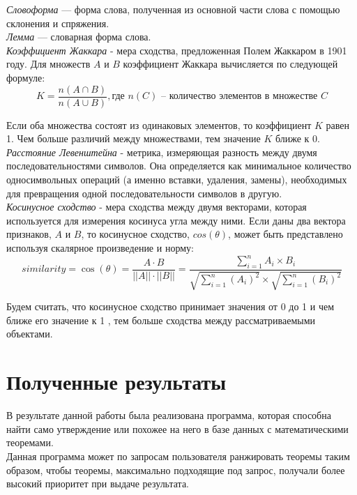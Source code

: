 \documentclass[12pt]{article}
\begin{document}
\textit{Словоформа} --- форма слова, полученная из основной части слова с помощью склонения и спряжения.\\

\textit{Лемма} --- словарная форма слова.\\

\textit{Коэффициент Жаккара} \cite{Jaccard} -  мера сходства, предложенная Полем Жаккаром в 1901 году. Для множеств $A$ и $B$ коэффициент Жаккара вычисляется по следующей формуле: $$K=\dfrac{n(A \cap B)}{n(A \cup B)}, \text{где } n(C) \text{ --  количество элементов в множестве } C$$

Если оба множества состоят из одинаковых элементов, то коэффициент $K$ равен 1. Чем больше различий между множествами, тем значение $K$ ближе к $0$. \\

\textit{Расстояние Левенштейна}  - метрика, измеряющая разность между двумя последовательностями символов. Она определяется как минимальное количество односимвольных операций (а именно вставки, удаления, замены), необходимых для превращения одной последовательности символов в другую.\cite{Levenshtein} \\

\textit{Косинусное сходство} -  мера сходства между двумя векторами, которая используется для измерения косинуса угла между ними. Если даны два вектора признаков, $A$ и $B$, то косинусное сходство, $cos(\theta)$, может быть представлено используя скалярное произведение и норму: 
$$similarity=\cos(\theta)=\dfrac{A \cdot B}{||A|| \cdot ||B||}=\dfrac{\sum \limits _{i=1}^{n} A_i \times B_i}{\sqrt{\sum \limits _{i=1}^{n} (A_i)^2} \times \sqrt{\sum \limits _{i=1}^{n} (B_i)^2}}$$

Будем считать, что косинусное сходство принимает значения от 0 до 1 и чем ближе его значение к 1 , тем больше сходства между рассматриваемыми объектами.

\newpage
\section{Полученные результаты}
В результате данной работы была реализована программа, которая способна найти само утверждение или похожее на него в базе данных с математическими теоремами. \\

Данная программа может по запросам пользователя ранжировать теоремы таким образом, чтобы теоремы, максимально подходящие под запрос, получали более высокий приоритет при выдаче результата. \\
\end{document}
